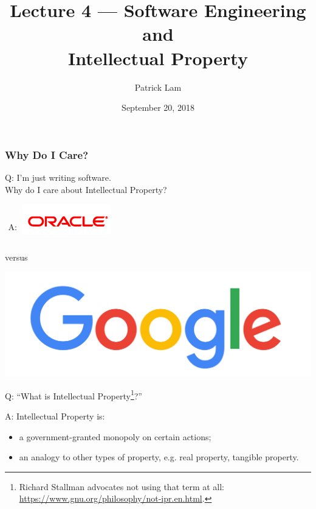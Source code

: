 

\title{Lecture 4 --- Software Engineering and\\ Intellectual Property}

\author{Patrick Lam}
\date{September 20, 2018}




\begin{frame}
  \titlepage

 \end{frame}
 

\begin{frame}
\frametitle{Why Do I Care?}
\begin{center}
\Large
\vspace*{-3em}
Q: I'm just writing software. \\
Why do I care about Intellectual Property?

$\begin{array}{cc}\mbox{A:}\\~\\~\\
\end{array}$
\includegraphics[width=.4\textwidth]{images/L04-oracle_clr.png}
\begin{minipage}{2em} versus \vspace*{1.4em}
\end{minipage}
\includegraphics[width=.4\textwidth]{images/L04-g-header-2480.png}


\end{center}
\end{frame}

\begin{frame}
\Large
\begin{changemargin}{2cm}
Q: ``What is Intellectual Property\footnote{Richard Stallman advocates not using that term at all: \url{https://www.gnu.org/philosophy/not-ipr.en.html}.}?''

A: Intellectual Property is:\\[0em]
\begin{itemize}
\item a government-granted monopoly on certain actions;
\item an analogy to other types of property, e.g. real property, tangible property.
\end{itemize}
\end{changemargin}
\end{frame}

